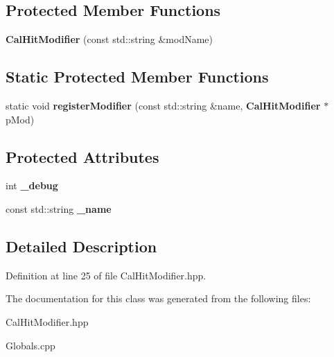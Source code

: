 \subsection*{Protected Member Functions}
\begin{DoxyCompactItemize}
\item 
{\bfseries Cal\-Hit\-Modifier} (const std\-::string \&mod\-Name)\label{classdigisim_1_1CalHitModifier_ad342fac586ba1bb42049f4f91880ea8a}

\end{DoxyCompactItemize}
\subsection*{Static Protected Member Functions}
\begin{DoxyCompactItemize}
\item 
static void {\bfseries register\-Modifier} (const std\-::string \&name, {\bf Cal\-Hit\-Modifier} $\ast$p\-Mod)\label{classdigisim_1_1CalHitModifier_a406b5226b448efcd0b3ef0027087b70c}

\end{DoxyCompactItemize}
\subsection*{Protected Attributes}
\begin{DoxyCompactItemize}
\item 
int {\bfseries \-\_\-debug}\label{classdigisim_1_1CalHitModifier_a6995b37aaaf3f1e9a6b0d125d0af6dd5}

\item 
const std\-::string {\bfseries \-\_\-name}\label{classdigisim_1_1CalHitModifier_a121de4a7e029ba9c96cfd2c93b7d3017}

\end{DoxyCompactItemize}


\subsection{Detailed Description}


Definition at line 25 of file Cal\-Hit\-Modifier.\-hpp.



The documentation for this class was generated from the following files\-:\begin{DoxyCompactItemize}
\item 
Cal\-Hit\-Modifier.\-hpp\item 
Globals.\-cpp\end{DoxyCompactItemize}

